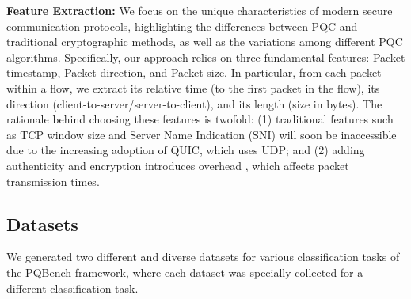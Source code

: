 \documentclass[10pt,journal]{IEEEtran}%
\begin{document}
\textbf{Feature Extraction:}
We focus on the unique characteristics of modern secure communication protocols, highlighting the differences between PQC and traditional cryptographic methods, as well as the variations among different PQC algorithms. Specifically, our approach relies on three fundamental features: Packet timestamp, Packet direction, and Packet size. In particular, from each packet within a flow, we extract its relative time (to the first packet in the flow), its direction (client-to-server/server-to-client), and its length (size in bytes). %
The rationale behind choosing these features is twofold: (1) traditional features such as TCP window size and Server Name Indication (SNI) will soon be inaccessible due to the increasing adoption of QUIC, which uses UDP; and (2) adding authenticity and encryption introduces overhead \cite{Raavi_phd, Raavi_paper}, which affects packet transmission times.

\subsection{Datasets}
We generated two different and diverse datasets for various classification tasks of the PQBench framework, where each dataset was specially collected for a different classification task.
\end{document}
